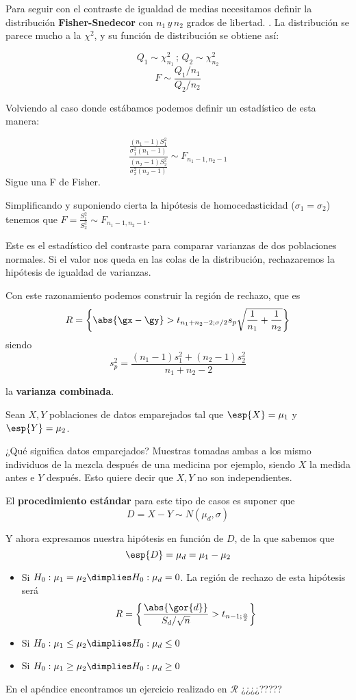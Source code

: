 \documentclass{apuntes}
\begin{document}
Para seguir con el contraste de igualdad de medias necesitamos definir la distribución \textbf{Fisher-Snedecor} con $n_1\,y\,n_2$ grados de libertad. . La distribución se parece mucho a la $\chi^2$, y su función de distribución se obtiene así:

\[Q_1 \sim \chi_{n_1}^2 \,;\, Q_2 \sim \chi_{n_2}^2\]
\[F \sim\displaystyle \frac{\displaystyle Q_1/n_1}{\displaystyle Q_2/n_2}\]

Volviendo al caso donde estábamos podemos definir un estadístico de esta manera:

\[\frac{\frac{(n_1-1)S_1^2}{\sigma_1^2(n_1-1)}}{\frac{(n_2-1)S_2^2}{\sigma_2^2 (n_2-1)}} \sim F_{n_1-1,n_2-1}\]
Sigue una F de Fisher.

Simplificando y suponiendo cierta la hipótesis de homocedasticidad ($\sigma_1 = \sigma_2$) tenemos que $F = \displaystyle \frac{S_1^2}{S_2^2} \sim F_{n_1-1,n_2-1}$.

Este es el estadístico del contraste para comparar varianzas de dos poblaciones normales. Si el valor nos queda en las colas de la distribución, rechazaremos la hipótesis de igualdad de varianzas.

Con este razonamiento podemos construir la región de rechazo, que es
\[R = \left\{ \abs{\gx - \gy} > t_{n_1+n_2-2;\sigma/2}s_p\sqrt{\frac{1}{n_1} + \frac{1}{n_2}} \right\} \]
siendo
\[ s_p^2 = \frac{(n_1-1)s_1^2 + (n_2-1)s_2^2}{n_1+n_2-2} \]

la \textbf{varianza combinada}.

\begin{example}
Sean $X,Y$ poblaciones de datos emparejados  tal que $\esp{X} = \mu_1$ y $\esp{Y} = \mu_2$.


¿Qué significa datos emparejados? Muestras tomadas ambas a los mismo individuos de la mezcla después de una medicina por ejemplo, siendo $X$ la medida antes e $Y$ después. Esto quiere decir que $X,Y$ no son independientes.

\pagebreak
\noindent El \textbf{procedimiento estándar} para este tipo de casos es suponer que
\[ D = X - Y \sim N(\mu_d,\sigma) \]

Y ahora expresamos nuestra hipótesis en función de $D$, de la que sabemos que
\[ \esp{D} = \mu_d = \mu_1-\mu_2 \]

\begin{itemize}
\item Si $H_0: \mu_1=\mu_2 \dimplies H_0: \mu_d=0 $. La región de rechazo de esta hipótesis será \[R = \left\{\frac{\abs{\gor{d}}}{S_d / \sqrt{n}} > t_{n-1;\frac{\alpha}{2}}\right\}\]
\item Si $H_0: \mu_1\leq\mu_2 \dimplies H_0: \mu_d\leq0 $
\item Si $H_0: \mu_1\geq\mu_2 \dimplies H_0: \mu_d\geq0 $
\end{itemize}
\end{example}
En el apéndice encontramos un ejercicio realizado en $\mathcal{R}$ ¿¿¿¿?????
\end{document}
